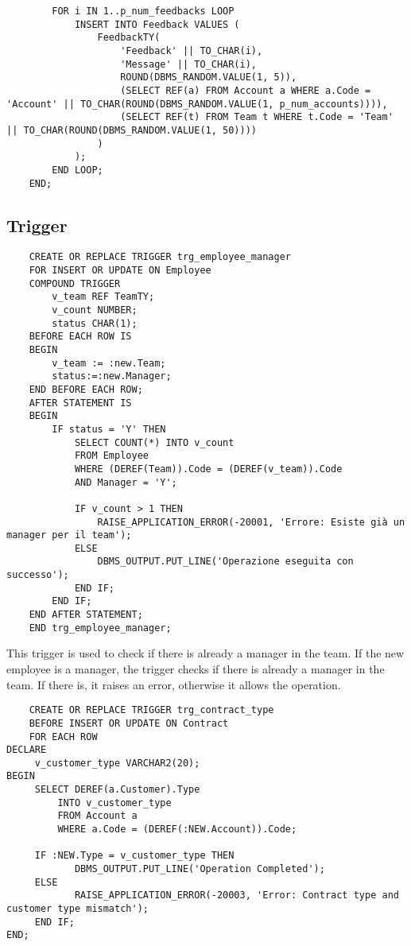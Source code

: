 \begin{lstlisting}
        FOR i IN 1..p_num_feedbacks LOOP
            INSERT INTO Feedback VALUES (
                FeedbackTY(
                    'Feedback' || TO_CHAR(i),
                    'Message' || TO_CHAR(i),
                    ROUND(DBMS_RANDOM.VALUE(1, 5)),
                    (SELECT REF(a) FROM Account a WHERE a.Code = 'Account' || TO_CHAR(ROUND(DBMS_RANDOM.VALUE(1, p_num_accounts)))),
                    (SELECT REF(t) FROM Team t WHERE t.Code = 'Team' || TO_CHAR(ROUND(DBMS_RANDOM.VALUE(1, 50))))
                )
            );
        END LOOP;
    END;
\end{lstlisting}

\subsection{Trigger}

\begin{lstlisting}
    CREATE OR REPLACE TRIGGER trg_employee_manager
    FOR INSERT OR UPDATE ON Employee
    COMPOUND TRIGGER
        v_team REF TeamTY;
        v_count NUMBER;
        status CHAR(1);
    BEFORE EACH ROW IS
    BEGIN
        v_team := :new.Team;
        status:=:new.Manager;
    END BEFORE EACH ROW;
    AFTER STATEMENT IS
    BEGIN
        IF status = 'Y' THEN
            SELECT COUNT(*) INTO v_count
            FROM Employee
            WHERE (DEREF(Team)).Code = (DEREF(v_team)).Code
            AND Manager = 'Y';
    
            IF v_count > 1 THEN
                RAISE_APPLICATION_ERROR(-20001, 'Errore: Esiste già un manager per il team');
            ELSE
                DBMS_OUTPUT.PUT_LINE('Operazione eseguita con successo');
            END IF;
        END IF;
    END AFTER STATEMENT;
    END trg_employee_manager;
\end{lstlisting}

This trigger is used to check if there is already a manager in the team. If the new employee is a manager, the trigger checks if there is already a manager in the team. If there is, it raises an error, otherwise it allows the operation.

\begin{lstlisting}
    CREATE OR REPLACE TRIGGER trg_contract_type
    BEFORE INSERT OR UPDATE ON Contract
    FOR EACH ROW
DECLARE
     v_customer_type VARCHAR2(20);
BEGIN
     SELECT DEREF(a.Customer).Type
         INTO v_customer_type
         FROM Account a
         WHERE a.Code = (DEREF(:NEW.Account)).Code;

     IF :NEW.Type = v_customer_type THEN
            DBMS_OUTPUT.PUT_LINE('Operation Completed');
     ELSE
            RAISE_APPLICATION_ERROR(-20003, 'Error: Contract type and customer type mismatch');
     END IF;
END;
\end{lstlisting}

